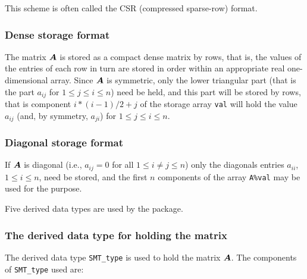 \documentclass{galahad}
\begin{document}
This scheme is often called the CSR (compressed sparse-row) format.

\subsubsection{Dense storage format}\label{dense}
The matrix ${\bm{A}}$ is stored as a compact
dense matrix by rows, that is, the values of the entries of each row in turn 
are stored in order within an appropriate real one-dimensional array.
Since ${\bm{A}}$ is symmetric, only the lower triangular part (that is the part
$a_{ij}$ for $1 \leq j \leq i \leq n$) need be held, and this part will be
stored by rows, that is component
$i \ast (i-1)/2 + j$ of the storage array {\tt val}
will hold the value $a_{ij}$ (and, by symmetry, $a_{ji}$)
for $1 \leq j \leq i \leq n$.

\subsubsection{Diagonal storage format}\label{diagonal}
If ${\bm{A}}$ is diagonal (i.e., $a_{ij} = 0$ for all $1 \leq i \neq j \leq n$)
only the diagonals entries $a_{ii}$, $1 \leq i \leq n$,  need be stored,
and the first $n$ components of the array {\tt A\%val} may be used for
the purpose.








\galtypes
Five derived data types are used by the package.


\subsubsection{The derived data type for holding the matrix}\label{typeprob}
The derived data type {\tt SMT\_type} is used to hold the matrix ${\bm{A}}$.
The components of {\tt SMT\_type} used are:
\end{document}
